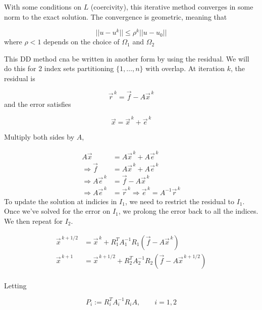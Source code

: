 With some conditions on $L$ (coercivity), this iterative method converges in some norm to the exact solution. The convergence is geometric, meaning that

\begin{equation*}
    || u-u^k|| \leq \rho^k || u-u_0||
\end{equation*}
where $\rho<1$ depends on the choice of $\Omega_1$ and $\Omega_2$


This DD method cna be written in another form by using the residual. We will do this for 2 index sets partitioning $\{ 1, \ldots, n \}$ with overlap. At iteration $k$, the residual is

\begin{equation*}
    \vec{r}^{\, k} = \vec{f} - A\vec{x}^{\, k}
\end{equation*}
and the error satisfies

\begin{equation*}
    \vec{x} = \vec{x}^{\, k} + \vec{e}^{\, k}
\end{equation*}

Multiply both sides by $A$,

\begin{align*}
    A\vec{x} &= A\vec{x}^{\, k} + A\vec{e}^{\, k}\\
    \Rightarrow \vec{f} &= A\vec{x}^{\, k} + A\vec{e}^{\, k}\\
    \Rightarrow A\vec{e}^{\, k} &=\vec{f} - A\vec{x}^{\, k} \\
    \Rightarrow A\vec{e}^{\, k} &=\vec{r}^{\, k}
    \Rightarrow \vec{e}^{\, k} =A^{-1}\vec{r}^{\, k}
\end{align*}
To update the solution at indicies in $I_1$, we need to restrict the residual to $I_1$. Once we've solved for the error on $I_1$, we prolong the error back to all the indices. We then repeat for $I_2$.

\begin{align*}
    \vec{x}^{\, k + 1/2} &= \vec{x}^{\, k} +
    R_1^T A_1^{-1} R_1
    \left(\vec{f} - A\vec{x}^{\, k}\right)\\
    \vec{x}^{\, k + 1} &= \vec{x}^{\, k + 1/2} +
    R_2^T A_2^{-1} R_2
    \left(\vec{f} - A\vec{x}^{\, k + 1/2}\right)\\
\end{align*}

Letting

\begin{equation*}
    P_i := R_i^T A_i^{-1} R_i A, \qquad i=1,2
\end{equation*}

